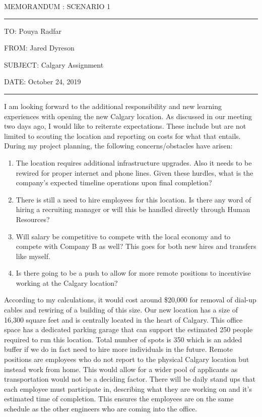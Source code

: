 \documentclass{article}
\begin{document}
\doublespacing

\begin{center}
MEMORANDUM : SCENARIO 1
\end{center}

\par\noindent\rule{\textwidth}{0.4pt}

\begin{flushleft}
TO: Pouya Radfar

FROM: Jared Dyreson

SUBJECT: Calgary Assignment

DATE: October 24, 2019
\end{flushleft}

\par\noindent\rule{\textwidth}{0.4pt}

I am looking forward to the additional responsibility and new learning experiences with opening the new Calgary location. As discussed in our meeting two days ago, I would like to reiterate expectations. These include but are not limited to scouting the location and reporting on costs for what that entails. 
During my project planning, the following concerns/obstacles have arisen: 

\begin{enumerate}
\item The location requires additional infrastructure upgrades. Also it needs to be rewired for proper internet and phone lines. Given these hurdles, what is the company's expected timeline operations upon final completion?
\item There is still a need to hire employees for this location. Is there any word of hiring a recruiting manager or will this be handled directly through Human Resources?
\item Will salary be competitive to compete with the local economy and to compete with Company B as well? This goes for both new hires and transfers like myself.
\item Is there going to be a push to allow for more remote positions to incentivise working at the Calgary location?

\end{enumerate}

According to my calculations, it would cost around \$20,000 for removal of dial-up cables and rewiring of a building of this size.
Our new location has a size of 16,300 square feet and is centrally located in the heart of Calgary.
This office space has a dedicated parking garage that can support the estimated 250 people required to run this location.
Total number of spots is 350 which is an added buffer if we do in fact need to hire more individuals in the future.
Remote positions are employees who do not report to the physical Calgary location but instead work from home. This would allow for a wider pool of applicants as transportation would not be a deciding factor.
There will be daily stand ups that each employee must participate in, describing what they are working on and it's estimated time of completion.
This ensures the employees are on the same schedule as the other engineers who are coming into the office.
\end{document}
